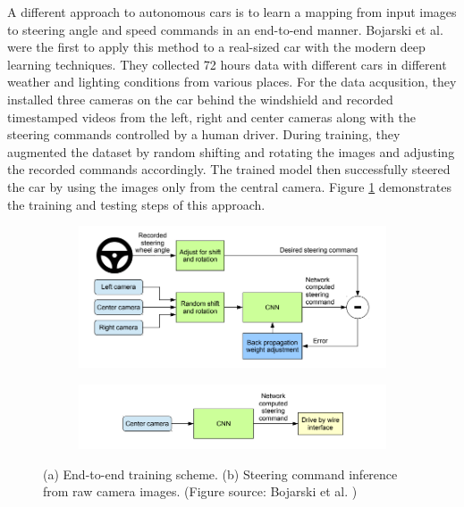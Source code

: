 A different approach to autonomous cars is to learn a mapping from input images
to steering angle and speed commands in an end-to-end manner. Bojarski et al.
\cite{Bojarski2016EndTE} were the first to apply this method to a real-sized
car with the modern deep learning techniques. They collected 72 hours data
with different cars in different weather and lighting conditions from various
places. For the data acqusition, they installed three cameras on the car behind
the windshield and recorded timestamped videos from the left, right and center
cameras along with the steering commands controlled by a human driver. During
training, they augmented the dataset by random shifting and rotating the images
and adjusting the recorded commands accordingly. The trained model then
successfully steered the car by using the images only from the central camera.
Figure \ref{figure:end-to-end-network} demonstrates the training and testing
steps of this approach.

\begin{figure}[h]
  \centering
  \begin{subfigure}[b]{1.0\linewidth}
    \includegraphics[width=\linewidth]{figures/end-to-end-training.png}
    \caption{}
  \end{subfigure}
  \begin{subfigure}[b]{1.0\linewidth}
    \includegraphics[width=\linewidth]{figures/end-to-end-inference.png}
    \caption{}
  \end{subfigure}
  \caption[End-to-end training and inference]{(a) End-to-end training scheme.
    (b) Steering command inference from raw camera images. (Figure source:
    Bojarski et al. \cite{Bojarski2016EndTE})}
  \label{figure:end-to-end-network}
\end{figure}

